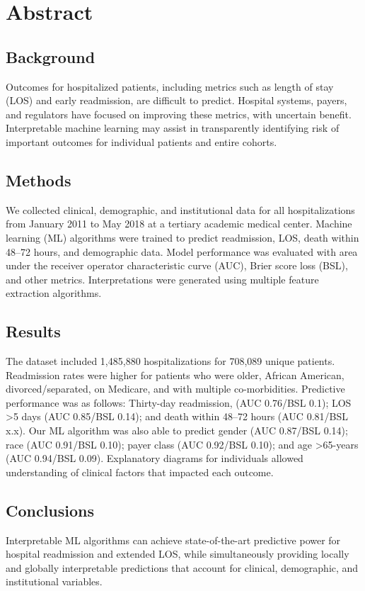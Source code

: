 \section{Abstract}
\subsection{Background}%
Outcomes for hospitalized patients, 
including metrics such as length of stay (LOS) and early readmission, 
are difficult to predict. 
Hospital systems, payers, and regulators have focused on 
improving these metrics, with uncertain benefit. 
Interpretable machine learning may assist in transparently identifying risk 
of important outcomes for individual patients and entire cohorts.
\subsection{Methods}%
We collected clinical, demographic, and institutional data 
for all hospitalizations from January 2011 to May 2018 
at a tertiary academic medical center. 
Machine learning (ML) algorithms were trained to predict 
readmission, LOS, death within 48–72 hours, and demographic data. 
Model performance was evaluated with 
area under the receiver operator characteristic curve (AUC), 
Brier score loss (BSL), and other metrics. 
Interpretations were generated using multiple feature extraction algorithms.
\subsection{Results}%
The dataset included 1,485,880 hospitalizations for 708,089 unique patients. 
Readmission rates were higher for patients who were 
older, African American, divorced/separated, on Medicare, 
and with multiple co-morbidities. 
Predictive performance was as follows: 
Thirty-day readmission, (AUC 0.76/BSL 0.1); 
LOS >5 days (AUC 0.85/BSL 0.14); 
and death within 48–72 hours (AUC 0.81/BSL x.x). 
Our ML algorithm was also able to predict 
gender (AUC 0.87/BSL 0.14); 
race (AUC 0.91/BSL 0.10); 
payer class (AUC 0.92/BSL 0.10); 
and age >65-years (AUC 0.94/BSL 0.09). 
Explanatory diagrams for individuals allowed understanding of 
clinical factors that impacted each outcome. 
\subsection{Conclusions}%
Interpretable ML algorithms can achieve 
state-of-the-art predictive power for hospital readmission and extended LOS, 
while simultaneously providing locally and globally interpretable predictions 
that account for clinical, demographic, and institutional variables.
\newpage%